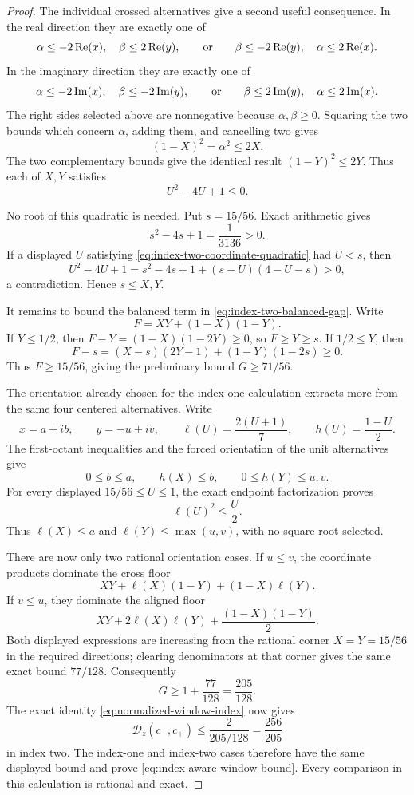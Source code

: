 \documentclass[11pt]{article}
\newcommand{\Ree}{\operatorname{Re}}
\newcommand{\Imm}{\operatorname{Im}}
\begin{document}
\begin{proof}
The individual crossed alternatives give a second useful consequence.  In
the real direction they are exactly one of
\[
 \alpha\le-2\Ree(x),\quad \beta\le2\Ree(y),
 \qquad\hbox{or}\qquad
 \beta\le-2\Ree(y),\quad \alpha\le2\Ree(x).
\]
In the imaginary direction they are exactly one of
\[
 \alpha\le-2\Imm(x),\quad \beta\le-2\Imm(y),
 \qquad\hbox{or}\qquad
 \beta\le2\Imm(y),\quad \alpha\le2\Imm(x).
\]
The right sides selected above are nonnegative because $\alpha,\beta\ge0$.
Squaring the two bounds which concern $\alpha$, adding them, and cancelling
two gives
\[
             (1-X)^2=\alpha^2\le2X.
\]
The two complementary bounds give the identical result
$(1-Y)^2\le2Y$.  Thus each of $X,Y$ satisfies
\begin{equation}
\label{eq:index-two-coordinate-quadratic}
                 U^2-4U+1\le0.
\end{equation}

No root of this quadratic is needed.  Put $s=15/56$.  Exact arithmetic gives
\[
                  s^2-4s+1=\frac1{3136}>0.
\]
If a displayed $U$ satisfying
\eqref{eq:index-two-coordinate-quadratic} had $U<s$, then
\[
 U^2-4U+1
   =s^2-4s+1+(s-U)(4-U-s)>0,
\]
a contradiction.  Hence $s\le X,Y$.

It remains to bound the balanced term in
\eqref{eq:index-two-balanced-gap}.  Write
\[
                  F=XY+(1-X)(1-Y).
\]
If $Y\le1/2$, then
$F-Y=(1-X)(1-2Y)\ge0$, so $F\ge Y\ge s$.  If $1/2\le Y$, then
\[
 F-s=(X-s)(2Y-1)+(1-Y)(1-2s)\ge0.
\]
Thus $F\ge15/56$, giving the preliminary bound $G\ge71/56$.

The orientation already chosen for the index-one calculation extracts more
from the same four centered alternatives.  Write
\[
 x=a+ib,\qquad y=-u+iv,\qquad
 \ell(U)=\frac{2(U+1)}7,\qquad
 h(U)=\frac{1-U}{2}.
\]
The first-octant inequalities and the forced orientation of the unit
alternatives give
\[
 0\le b\le a,\qquad h(X)\le b,\qquad
 0\le h(Y)\le u,v.
\]
For every displayed $15/56\le U\le1$, the exact endpoint factorization
proves
\begin{equation}
\label{eq:centered-affine-minorant}
                    \ell(U)^2\le\frac U2.
\end{equation}
Thus $\ell(X)\le a$ and
$\ell(Y)\le\max(u,v)$, with no square root selected.

There are now only two rational orientation cases.  If $u\le v$, the
coordinate products dominate the cross floor
\[
 XY+\ell(X)(1-Y)+(1-X)\ell(Y).
\]
If $v\le u$, they dominate the aligned floor
\[
 XY+2\ell(X)\ell(Y)+\frac{(1-X)(1-Y)}2.
\]
Both displayed expressions are increasing from the rational corner
$X=Y=15/56$ in the required directions; clearing denominators at that corner
gives the same exact bound $77/128$.  Consequently
\[
 G\ge1+\frac{77}{128}=\frac{205}{128}.
\]
The exact identity \eqref{eq:normalized-window-index} now gives
\[
 \mathcal D_z(c_-,c_+)\le
 \frac{2}{205/128}=\frac{256}{205}
\]
in index two.  The index-one and index-two cases therefore have the same
displayed bound and prove \eqref{eq:index-aware-window-bound}.  Every
comparison in this calculation is rational and exact.


\end{proof}
\end{document}
